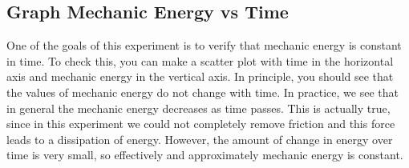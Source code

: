 \subsection{Graph Mechanic Energy vs Time}
One of the goals of this experiment is to verify that mechanic energy is constant in time. To check this, you can make a scatter plot with time in the horizontal axis and mechanic energy in the vertical axis. In principle, you should see that the values of mechanic energy do not change with time. In practice, we see that in general the mechanic energy decreases as time passes. This is actually true, since in this experiment we could not completely remove friction and this force leads to a dissipation of energy. However, the amount of change in energy over time is very small, so effectively and approximately mechanic energy is constant.

